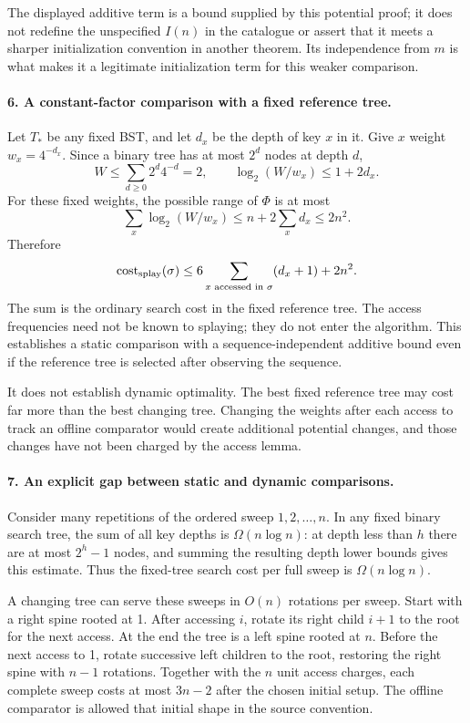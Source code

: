 \documentclass[11pt]{article}
\begin{document}
The displayed additive term is a bound supplied by this potential proof; it does not redefine the unspecified $I(n)$ in the catalogue or assert that it meets a sharper initialization convention in another theorem. Its independence from $m$ is what makes it a legitimate initialization term for this weaker comparison.

\paragraph{6. A constant-factor comparison with a fixed reference tree.}
Let $T_*$ be any fixed BST, and let $d_x$ be the depth of key $x$ in it. Give $x$ weight $w_x=4^{-d_x}$. Since a binary tree has at most $2^d$ nodes at depth $d$,
\[
 W\le\sum_{d\ge0}2^d4^{-d}=2,
 \qquad
 \log_2(W/w_x)\le1+2d_x.
\]
For these fixed weights, the possible range of $\Phi$ is at most
\[
 \sum_x\log_2(W/w_x)\le n+2\sum_xd_x\le2n^2.
\]
Therefore
\[
 \operatorname{cost}_{\rm splay}(\sigma)
 \le6\sum_{x\text{ accessed in }\sigma}(d_x+1)+2n^2.
\]
The sum is the ordinary search cost in the fixed reference tree. The access frequencies need not be known to splaying; they do not enter the algorithm. This establishes a static comparison with a sequence-independent additive bound even if the reference tree is selected after observing the sequence.

It does not establish dynamic optimality. The best fixed reference tree may cost far more than the best changing tree. Changing the weights after each access to track an offline comparator would create additional potential changes, and those changes have not been charged by the access lemma.

\paragraph{7. An explicit gap between static and dynamic comparisons.}
Consider many repetitions of the ordered sweep $1,2,\ldots,n$. In any fixed binary search tree, the sum of all key depths is $\Omega(n\log n)$: at depth less than $h$ there are at most $2^h-1$ nodes, and summing the resulting depth lower bounds gives this estimate. Thus the fixed-tree search cost per full sweep is $\Omega(n\log n)$.

A changing tree can serve these sweeps in $O(n)$ rotations per sweep. Start with a right spine rooted at 1. After accessing $i$, rotate its right child $i+1$ to the root for the next access. At the end the tree is a left spine rooted at $n$. Before the next access to 1, rotate successive left children to the root, restoring the right spine with $n-1$ rotations. Together with the $n$ unit access charges, each complete sweep costs at most $3n-2$ after the chosen initial setup. The offline comparator is allowed that initial shape in the source convention.
\end{document}
